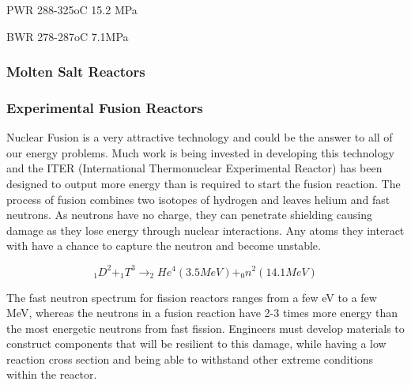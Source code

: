 PWR 288-325oC 15.2 MPa\cite{ocw01}

BWR 278-287oC 7.1MPa\cite{ocw02}



\subsubsection{Molten Salt Reactors}





\subsubsection{Experimental Fusion Reactors}

Nuclear Fusion is a very attractive technology and could be the answer to all of our energy problems.  Much work is being invested in developing this technology and the ITER (International Thermonuclear Experimental Reactor) has been designed to output more energy than is required to start the fusion reaction.  The process of fusion combines two isotopes of hydrogen and leaves helium and fast neutrons.  As neutrons have no charge, they can penetrate shielding causing damage as they lose energy through nuclear interactions.   Any atoms they interact with have a chance to capture the neutron and become unstable.

\begin{equation}
_{1}D^{2} + _{1}T^{3} \to _{2}He^{4} (3.5MeV) + _{0}n^{2} (14.1MeV)
\end{equation}

The fast neutron spectrum for fission reactors ranges from a few eV to a few MeV, whereas the neutrons in a fusion reaction have 2-3 times more energy than the most energetic neutrons from fast fission.  Engineers must develop materials to construct components that will be resilient to this damage, while having a low reaction cross section and being able to withstand other extreme conditions within the reactor.  








